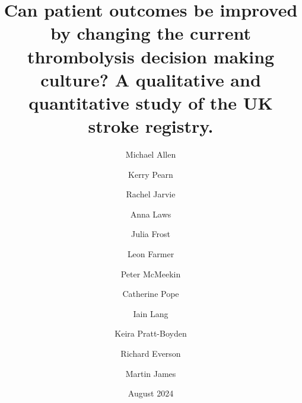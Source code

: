 \title{Can patient outcomes be improved by changing the current thrombolysis decision making culture? A qualitative and quantitative study of the UK stroke registry.}
\date{August 2024}

\renewcommand{\thefootnote}{\fnsymbol{footnote}}

\author[*1,2]{Michael Allen}
\author[1,2]{Kerry Pearn}
\author[1]{Rachel Jarvie}
\author[1]{Anna Laws}
\author[1]{Julia Frost}
\author[1]{Leon Farmer}
\author[3]{Peter McMeekin}
\author[4]{Catherine Pope}
\author[1]{Iain Lang}
\author[1]{Keira Pratt-Boyden}
\author[1]{Richard Everson}
\author[1,5]{Martin James}

